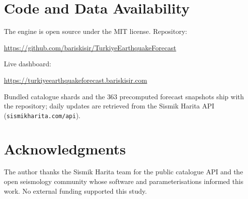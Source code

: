 \documentclass[11pt,a4paper]{article}
\begin{document}
\section*{Code and Data Availability}
The engine is open source under the MIT license. Repository:
\begin{center}
\url{https://github.com/bariskisir/TurkiyeEarthquakeForecast}
\end{center}
Live dashboard:
\begin{center}
\url{https://turkiyeearthquakeforecast.bariskisir.com}
\end{center}
Bundled catalogue shards and the $363$ precomputed forecast snapshots ship
with the repository; daily updates are retrieved from the Sismik Harita API
(\texttt{sismikharita.com/api}).

\section*{Acknowledgments}
The author thanks the Sismik Harita team for the public catalogue API and
the open seismology community whose software and parameterisations informed
this work. No external funding supported this study.

\FloatBarrier
\end{document}
